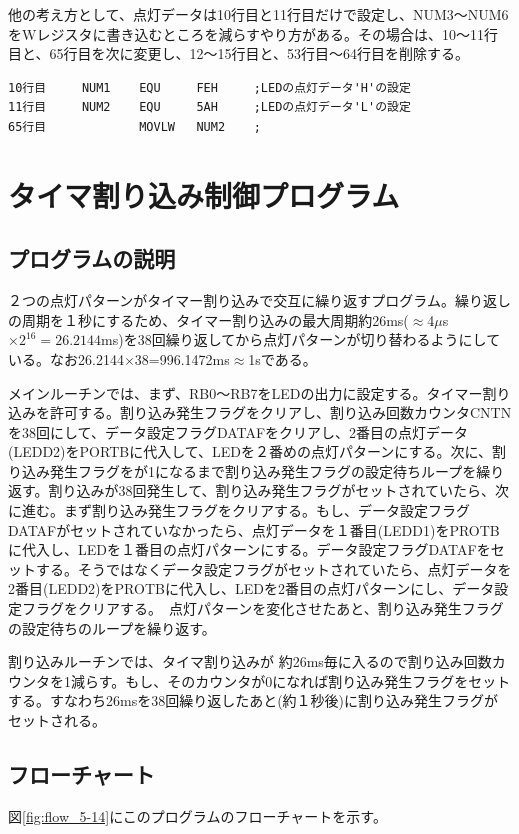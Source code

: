 \documentclass[a4paper,12pt]{ujarticle}
\begin{document}
      他の考え方として、点灯データは10行目と11行目だけで設定し、NUM3〜NUM6をWレジスタに書き込むところを減らすやり方がある。その場合は、10〜11行目と、65行目を次に変更し、12〜15行目と、53行目〜64行目を削除する。
      \begin{lstlisting}[basicstyle=\ttfamily\footnotesize, frame=single]
10行目     NUM1    EQU     FEH     ;LEDの点灯データ'H'の設定
11行目     NUM2    EQU     5AH     ;LEDの点灯データ'L'の設定
65行目             MOVLW   NUM2    ;
      \end{lstlisting}


 \clearpage
 \section{タイマ割り込み制御プログラム}
  \subsection{プログラムの説明}

２つの点灯パターンがタイマー割り込みで交互に繰り返すプログラム。繰り返しの周期を１秒にするため、タイマー割り込みの最大周期約26ms($\approx$4$\mu$s$\times 2^{16}=26.2144$ms)を38回繰り返してから点灯パターンが切り替わるようにしている。なお26.2144$\times$38=996.1472ms$\approx$1sである。

  メインルーチンでは、まず、RB0〜RB7をLEDの出力に設定する。タイマー割り込みを許可する。割り込み発生フラグをクリアし、割り込み回数カウンタCNTNを38回にして、データ設定フラグDATAFをクリアし、2番目の点灯データ(LEDD2)をPORTBに代入して、LEDを２番めの点灯パターンにする。次に、割り込み発生フラグをが1になるまで割り込み発生フラグの設定待ちループを繰り返す。割り込みが38回発生して、割り込み発生フラグがセットされていたら、次に進む。まず割り込み発生フラグをクリアする。もし、データ設定フラグDATAFがセットされていなかったら、点灯データを１番目(LEDD1)をPROTBに代入し、LEDを１番目の点灯パターンにする。データ設定フラグDATAFをセットする。そうではなくデータ設定フラグがセットされていたら、点灯データを2番目(LEDD2)をPROTBに代入し、LEDを2番目の点灯パターンにし、データ設定フラグをクリアする。　点灯パターンを変化させたあと、割り込み発生フラグの設定待ちのループを繰り返す。

  割り込みルーチンでは、タイマ割り込みが
約26ms毎に入るので割り込み回数カウンタを1減らす。もし、そのカウンタが0になれば割り込み発生フラグをセットする。すなわち26msを38回繰り返したあと(約１秒後)に割り込み発生フラグがセットされる。


  \subsection{フローチャート}
  図\ref{fig:flow_5-14}にこのプログラムのフローチャートを示す。
\end{document}
